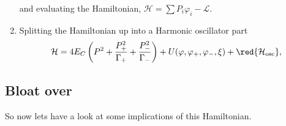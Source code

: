 \begin{enumerate}
  \noindent and evaluating the Hamiltonian, $ \mathcal{H} = \sum P_i\varphi_i - \mathcal{L} $.
\item Splitting the Hamiltonian up into a Harmonic oscillator part
  \begin{equation}\label{key}
    \mathcal{H} = 4E_C\left(P^2 + \frac{P_+^2}{\Gamma_+} + \frac{P_-^2}{\Gamma_-}\right) + U(\varphi, \varphi_+, \varphi_-, \xi) + \red{\mathcal{H}_\text{osc}},
  \end{equation}
  	
  \noindent {}
\end{enumerate}

\subsection{Bloat over}
So now lets have a look at some implications of this Hamiltonian.
 
